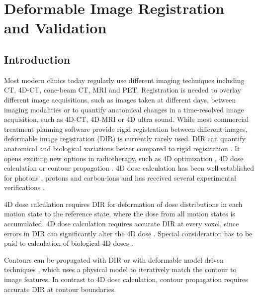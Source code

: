\documentclass[type=dr, dr=rernat, accentcolor=tud7b,colorbacktitle, bigchapter, openright, twoside, 12pt ]{tudthesis}
\begin{document}
\chapter{Deformable Image Registration and Validation}
\label{chapter:vmm}
\minitoc

\section{Introduction}


Most modern clinics today regularly use different imaging techniques including CT, 4D-CT, cone-beam CT, MRI and PET. Registration is needed to overlay different image acquisitions, such as images taken at different days,
between imaging modalities or to quantify anatomical changes in a time-resolved image acquisition, such as 4D-CT, 4D-MRI or 4D ultra sound. While most commercial treatment planning software provide rigid registration between different images, deformable image registration (DIR) is currently rarely used. 
DIR can quantify anatomical and biological variations better compared to rigid registration \cite{Sarrut2006}. It opens exciting new options in radiotherapy, such as 4D optimization \cite{Trofimov2005}, 
4D dose calculation \cite{Flampouri2006} or contour propagation \cite{Lu2006b}. 4D dose calculation has been well established for photons \cite{Ong2016}, protons \cite{Paganetti2005} and carbon-ions \cite{Gemmel2011} and has received
several experimental verifications \cite{Vinogradskiy2009, Perrin2016, Bert2012a}. 

4D dose calculation requires DIR for deformation of dose distributions in each motion state
to the reference state, where the dose from all motion states is accumulated. 4D dose calculation requires accurate DIR at every voxel, since errors in DIR can significantly alter the 4D dose \cite{Heath2006}. Special consideration has to be paid to calculation of biological 4D doses \cite{Gemmel2011}. 

Contours can be propagated with DIR \cite{Lu2006a, Rietzel2005a} or
with deformable model driven techniques \cite{McInerney1996, Montagnat2005}, which uses a physical model to iteratively match the contour to image features. In contrast to 4D dose calculation, contour propagation requires accurate DIR at contour boundaries.
\end{document}
